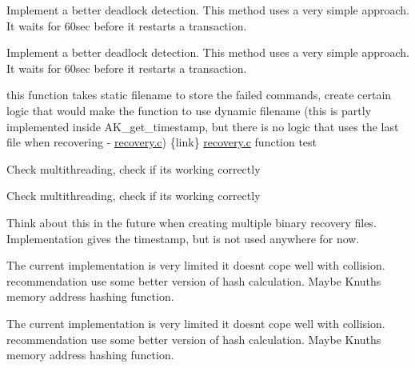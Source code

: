
\begin{DoxyRefList}
\item[\label{todo__todo000004}%
\Hypertarget{todo__todo000004}%
Member \hyperlink{transaction_8h_a32d2de9c87a4523887516bba8308ab34}{A\+K\+\_\+acquire\+\_\+lock} (int, int, pthread\+\_\+t)]Implement a better deadlock detection. This method uses a very simple approach. It waits for 60sec before it restarts a transaction.  
\item[\label{todo__todo000004}%
\Hypertarget{todo__todo000004}%
Member \hyperlink{transaction_8h_a32d2de9c87a4523887516bba8308ab34}{A\+K\+\_\+acquire\+\_\+lock} (int, int, pthread\+\_\+t)]Implement a better deadlock detection. This method uses a very simple approach. It waits for 60sec before it restarts a transaction.  
\item[\label{todo__todo000001}%
\Hypertarget{todo__todo000001}%
Member \hyperlink{archive__log_8h_a72fad2939e983ee9fd31703c34a25db3}{A\+K\+\_\+archive\+\_\+log} (int sig)]this function takes static filename to store the failed commands, create certain logic that would make the function to use dynamic filename (this is partly implemented inside A\+K\+\_\+get\+\_\+timestamp, but there is no logic that uses the last file when recovering -\/ \hyperlink{recovery_8c}{recovery.\+c}) \{link\} \hyperlink{recovery_8c}{recovery.\+c} function test  
\item[\label{todo__todo000005}%
\Hypertarget{todo__todo000005}%
Member \hyperlink{transaction_8h_ae63e0defc409bd7cd8b12f0fe44739c8}{A\+K\+\_\+execute\+\_\+commands} (command $\ast$, int)]Check multithreading, check if it\textquotesingle{}s working correctly  
\item[\label{todo__todo000005}%
\Hypertarget{todo__todo000005}%
Member \hyperlink{transaction_8h_ae63e0defc409bd7cd8b12f0fe44739c8}{A\+K\+\_\+execute\+\_\+commands} (command $\ast$, int)]Check multithreading, check if it\textquotesingle{}s working correctly  
\item[\label{todo__todo000002}%
\Hypertarget{todo__todo000002}%
Member \hyperlink{archive__log_8h_aeb31379a188616575d445bcb0fd6a982}{A\+K\+\_\+get\+\_\+timestamp} ()]Think about this in the future when creating multiple binary recovery files. Implementation gives the timestamp, but is not used anywhere for now.  
\item[\label{todo__todo000003}%
\Hypertarget{todo__todo000003}%
Member \hyperlink{transaction_8h_a13fcff2b52d3512807dedb55ce61e735}{A\+K\+\_\+memory\+\_\+block\+\_\+hash} (int)]The current implementation is very limited it doesn\textquotesingle{}t cope well with collision. recommendation use some better version of hash calculation. Maybe Knuth\textquotesingle{}s memory address hashing function.  
\item[\label{todo__todo000003}%
\Hypertarget{todo__todo000003}%
Member \hyperlink{transaction_8h_a13fcff2b52d3512807dedb55ce61e735}{A\+K\+\_\+memory\+\_\+block\+\_\+hash} (int)]The current implementation is very limited it doesn\textquotesingle{}t cope well with collision. recommendation use some better version of hash calculation. Maybe Knuth\textquotesingle{}s memory address hashing function. 
\end{DoxyRefList}